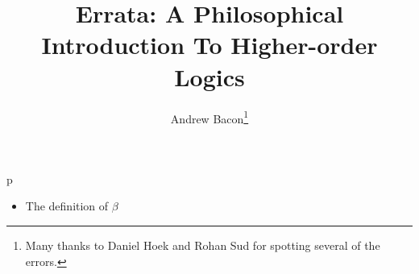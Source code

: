 \documentclass{article}
\title{Errata: A Philosophical Introduction To Higher-order Logics}
\author{Andrew Bacon\thanks{Many thanks to Daniel Hoek and Rohan Sud for spotting several of the errors.}}
\begin{document}
\maketitle

p
\begin{itemize}
	\item[] The definition of $\beta$
\end{itemize}
\end{document}
